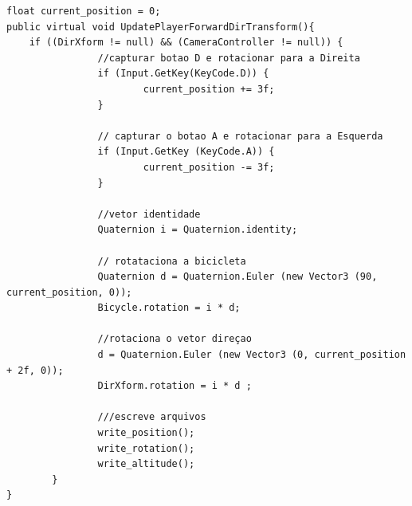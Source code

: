 \begin{lstlisting}
float current_position = 0;
public virtual void UpdatePlayerForwardDirTransform(){
	if ((DirXform != null) && (CameraController != null)) {
				//capturar botao D e rotacionar para a Direita
				if (Input.GetKey(KeyCode.D)) {
						current_position += 3f;
				}

				// capturar o botao A e rotacionar para a Esquerda
				if (Input.GetKey (KeyCode.A)) {
						current_position -= 3f;
				}

				//vetor identidade
				Quaternion i = Quaternion.identity;

				// rotataciona a bicicleta
				Quaternion d = Quaternion.Euler (new Vector3 (90, current_position, 0));
				Bicycle.rotation = i * d;

				//rotaciona o vetor direçao
				d = Quaternion.Euler (new Vector3 (0, current_position + 2f, 0));
				DirXform.rotation = i * d ;

				///escreve arquivos 
				write_position();
				write_rotation();
				write_altitude();
		}
}
\end{lstlisting}




